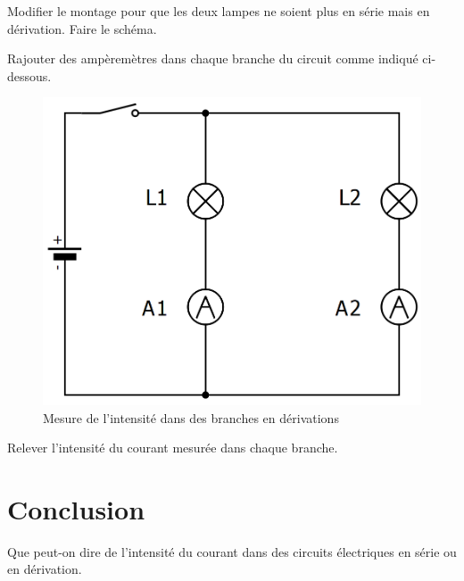 \documentclass[a4paper,11pt]{exam}
\begin{document}
	\begin{questions}
		\question Modifier le montage pour que les deux lampes ne soient plus en série mais en dérivation. Faire le schéma.
		
		\makeemptybox{6cm}
		
		
		\question Rajouter des ampèremètres dans chaque branche du circuit comme indiqué ci-dessous.
		
		\begin{figure}[h!]
			\begin{center}
				\includegraphics[scale=0.25]{img/intensite_drv}
			\end{center}
		
			\caption{Mesure de l'intensité dans des branches en dérivations}
		\end{figure}
	
		\question Relever l'intensité du courant mesurée dans chaque branche.
	\end{questions}

\section{Conclusion}

\begin{questions}
	\question Que peut-on dire de l'intensité du courant dans des circuits électriques en série ou en dérivation.
	
	\fillwithdottedlines{4cm}
\end{questions}

\ \label{LastPage}
\end{document}

